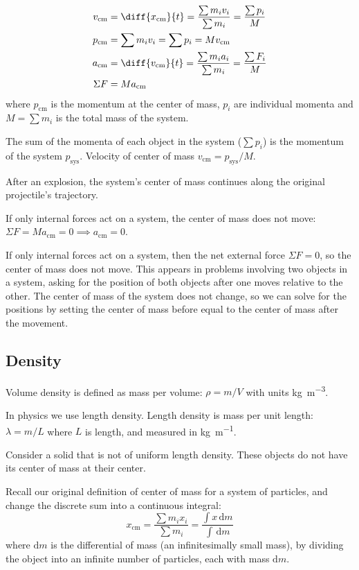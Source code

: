 \documentclass{article}
\newcommand{\theorem}[2]{\begin{tcolorbox}[title={#1},colback=blue!5!white,colframe=blue!75!black,parbox=false] #2 \end{tcolorbox}}
\newcommand{\remark}[2]{\begin{tcolorbox}[title={#1},colback=black!5!white,colframe=black!75!black,parbox=false] #2 \end{tcolorbox}}
\begin{document}
\theorem{Center of mass, velocity, acceleration, momentum and force}{
	\begin{align*}
		v_\text{cm}&=\diff{x_\text{cm}}{t}=\frac{\sum m_iv_i}{\sum m_i}=\frac{\sum p_i}{M} \\
		p_\text{cm}&=\sum m_iv_i=\sum p_i=Mv_ \text{cm} \\
		a_\text{cm}&=\diff{v_\text{cm}}{t}=\frac{\sum m_ia_i}{\sum m_i}=\frac{\sum F_i}{M} \\
		\Sigma F&=Ma_\text{cm}
	\end{align*}
	where $p_\text{cm}$ is the momentum at the center of mass, $p_i$ are individual momenta and $M=\sum m_i$ is the total mass of the system.

	The sum of the momenta of each object in the system ($\sum p_i$) is the  momentum of the system $p_\text{sys}$. Velocity of center of mass $v_\text{cm}=p_\text{sys}/M$.

	After an explosion, the system's center of mass continues along the original projectile's trajectory.

	If only internal forces act on a system, the center of mass does not move: $\Sigma F=Ma_\text{cm}=0 \implies a_\text{cm}=0$.
}

\remark{Center of mass and internal forces}{
	If only internal forces act on a system, then the net external force $\Sigma F=0$, so the center of mass does not move. This appears in problems involving two objects in a system, asking for the position of both objects after one moves relative to the other. The center of mass of the system does not change, so we can solve for the positions by setting the center of mass before equal to the center of mass after the movement.
}

\subsection{Density}

Volume density is defined as mass per volume: $\rho=m/V$ with units \si{\kilo\gram\per\meter^3}.

In physics we use length density. Length density is mass per unit length: $\lambda=m/L$ where $L$ is length, and measured in \si{\kilo\gram\per\meter}.

Consider a solid that is not of uniform length density. These objects do not have its center of mass at their center.

Recall our original definition of center of mass for a system of particles, and change the discrete sum into a continuous integral:
\begin{equation*}
    x_ \text{cm}=\frac{\sum m_ix_i}{\sum m_i}
	=\frac{\int x\,\mathrm{d}m}{\int \,\mathrm{d}m}
\end{equation*}
where $\mathrm{d}m$ is the differential of mass (an infinitesimally small mass), by dividing the object into an infinite number of particles, each with mass $\mathrm{d}m$.
\end{document}
